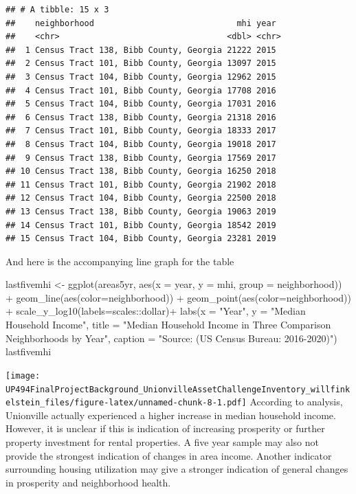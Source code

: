 \documentclass[
]{article}
\newenvironment{Shaded}{\begin{snugshade}}{\end{snugshade}}
\newcommand{\AttributeTok}[1]{\textcolor[rgb]{0.77,0.63,0.00}{#1}}
\newcommand{\FunctionTok}[1]{\textcolor[rgb]{0.00,0.00,0.00}{#1}}
\newcommand{\NormalTok}[1]{#1}
\newcommand{\OtherTok}[1]{\textcolor[rgb]{0.56,0.35,0.01}{#1}}
\newcommand{\SpecialCharTok}[1]{\textcolor[rgb]{0.00,0.00,0.00}{#1}}
\newcommand{\StringTok}[1]{\textcolor[rgb]{0.31,0.60,0.02}{#1}}
\begin{document}
\begin{verbatim}
## # A tibble: 15 x 3
##    neighborhood                             mhi year 
##    <chr>                                  <dbl> <chr>
##  1 Census Tract 138, Bibb County, Georgia 21222 2015 
##  2 Census Tract 101, Bibb County, Georgia 13097 2015 
##  3 Census Tract 104, Bibb County, Georgia 12962 2015 
##  4 Census Tract 101, Bibb County, Georgia 17708 2016 
##  5 Census Tract 104, Bibb County, Georgia 17031 2016 
##  6 Census Tract 138, Bibb County, Georgia 21318 2016 
##  7 Census Tract 101, Bibb County, Georgia 18333 2017 
##  8 Census Tract 104, Bibb County, Georgia 19018 2017 
##  9 Census Tract 138, Bibb County, Georgia 17569 2017 
## 10 Census Tract 138, Bibb County, Georgia 16250 2018 
## 11 Census Tract 101, Bibb County, Georgia 21902 2018 
## 12 Census Tract 104, Bibb County, Georgia 22500 2018 
## 13 Census Tract 138, Bibb County, Georgia 19063 2019 
## 14 Census Tract 101, Bibb County, Georgia 18542 2019 
## 15 Census Tract 104, Bibb County, Georgia 23281 2019
\end{verbatim}

And here is the accompanying line graph for the table

\begin{Shaded}
\begin{Highlighting}[]
\NormalTok{lastfivemhi }\OtherTok{\textless{}{-}} \FunctionTok{ggplot}\NormalTok{(areas5yr, }\FunctionTok{aes}\NormalTok{(}\AttributeTok{x =}\NormalTok{ year, }\AttributeTok{y =}\NormalTok{ mhi, }\AttributeTok{group =}\NormalTok{ neighborhood)) }\SpecialCharTok{+} 
\FunctionTok{geom\_line}\NormalTok{(}\FunctionTok{aes}\NormalTok{(}\AttributeTok{color=}\NormalTok{neighborhood)) }\SpecialCharTok{+}
\FunctionTok{geom\_point}\NormalTok{(}\FunctionTok{aes}\NormalTok{(}\AttributeTok{color=}\NormalTok{neighborhood)) }\SpecialCharTok{+}
\FunctionTok{scale\_y\_log10}\NormalTok{(}\AttributeTok{labels=}\NormalTok{scales}\SpecialCharTok{::}\NormalTok{dollar)}\SpecialCharTok{+}
\FunctionTok{labs}\NormalTok{(}\AttributeTok{x =} \StringTok{"Year"}\NormalTok{, }\AttributeTok{y =} \StringTok{"Median Household Income"}\NormalTok{,}
     \AttributeTok{title =} \StringTok{"Median Household Income in Three Comparison Neighborhoods by Year"}\NormalTok{,}
     \AttributeTok{caption =} \StringTok{"Source: (US Census Bureau: 2016{-}2020)"}\NormalTok{)}
\NormalTok{lastfivemhi}
\end{Highlighting}
\end{Shaded}

\texttt{[image: UP494FinalProjectBackground\_UnionvilleAssetChallengeInventory\_willfinkelstein\_files/figure-latex/unnamed-chunk-8-1.pdf]}
According to analysis, Unionville actually experienced a higher increase
in median household income. However, it is unclear if this is indication
of increasing prosperity or further property investment for rental
properties. A five year sample may also not provide the strongest
indication of changes in area income. Another indicator surrounding
housing utilization may give a stronger indication of general changes in
prosperity and neighborhood health.
\end{document}
